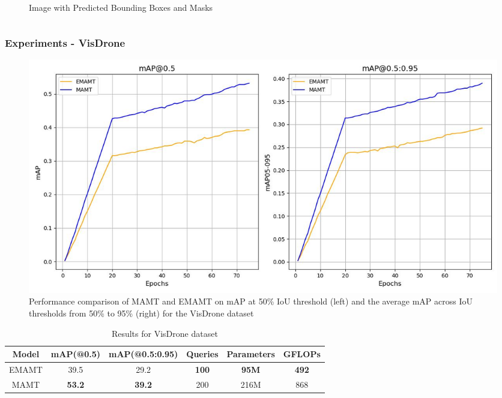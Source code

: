 \documentclass{beamer}
\begin{document}
\begin{frame}[t]
\begin{columns}
\begin{column}{0.5\textwidth}
\begin{figure}
        \caption{Image with Predicted Bounding Boxes and Masks}
        \label{fig:post-pre-process}
      \end{figure}
    \end{column}
  \end{columns}
\end{frame}


\begin{frame}[t]
  \scriptsize
  \frametitle{Experiments - VisDrone}

  \begin{figure}[h!]
    \centering
    \includegraphics[scale=0.25]{Figures/vis_train.jpg}
    \caption{Performance comparison of MAMT and EMAMT on mAP at 50\% IoU threshold (left) and the average mAP across IoU thresholds from 50\% to 95\% (right) 
    for the VisDrone dataset}
    \label{fig:uav-train}
  \end{figure}

  \begin{table}[h]
    \centering
    \begin{tabular}{|c|c|c|c|c|c|}
        \hline
        \textbf{Model}     & \textbf{mAP(@0.5)}     & \textbf{mAP(@0.5:0.95)}    & \textbf{Queries}   & \textbf{Parameters} & \textbf{GFLOPs}  \\ \hline
        EMAMT              & 39.5                   & 29.2                       & \textbf{100}       & \textbf{95M}        &  \textbf{492}     \\ \hline
        MAMT               & \textbf{53.2}          & \textbf{39.2}              & 200                & 216M                &  868              \\ \hline
    \end{tabular}
    \caption{Results for VisDrone dataset}
    \label{tab:vis_results}
  \end{table}
\end{frame}
\end{document}
